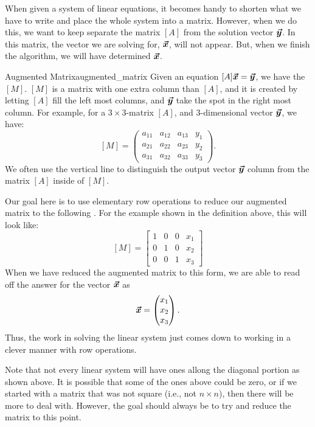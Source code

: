         When given a system of linear equations, it becomes handy to shorten what we have to write and place the whole system into a matrix.  However, when we do this, we want to keep separate the matrix $[A]$ from the solution vector $\boldsymbol{\boldsymbol{\vec{y}}}$. In this matrix, the vector we are solving for, $\boldsymbol{\boldsymbol{\vec{x}}}$, will not appear. But, when we finish the algorithm, we will have determined $\boldsymbol{\boldsymbol{\vec{x}}}$.
        
        \begin{df}{Augmented Matrix}{augmented_matrix}
        Given an equation $[A]\boldsymbol{\boldsymbol{\vec{x}}}=\boldsymbol{\boldsymbol{\vec{y}}}$, we have the   $[M]$. $[M]$ is a matrix with one extra column than $[A]$, and it is created by letting $[A]$ fill the left most columns, and $\boldsymbol{\boldsymbol{\vec{y}}}$ take the spot in the right most column. For example, for a $3\times3$-matrix $[A]$, and $3$-dimensional vector $\boldsymbol{\boldsymbol{\vec{y}}}$, we have:
        \[
        [M]=\left(\begin{array}{ccc|c}
        a_{11} & a_{12} & a_{13}  &  y_1 \\
        a_{21} & a_{22} & a_{23} & y_2\\
        a_{31} & a_{32} & a_{33} & y_3
        \end{array}\right).
        \]
        We often use the vertical line to distinguish the output vector $\boldsymbol{\boldsymbol{\vec{y}}}$ column from the matrix $[A]$ inside of $[M]$.
        \end{df}
        
        Our goal here is to use elementary row operations to reduce our augmented matrix to the following .  For the example shown in the definition above, this will look like:
        \[
        [M]=\left[\begin{array}{ccc|c}
        1 & 0 & 0  &  x_1 \\
        0 & 1 & 0 & x_2\\
        0 & 0 & 1 & x_3
        \end{array}\right]
        \]
        When we have reduced the augmented matrix to this form, we are able to read off the answer for the vector $\boldsymbol{\boldsymbol{\vec{x}}}$ as
        \[
        \boldsymbol{\boldsymbol{\vec{x}}} = \begin{pmatrix} x_1 \\ x_2 \\ x_3 \end{pmatrix}.
        \]
        Thus, the work in solving the linear system just comes down to working in a clever manner with row operations.
        
        \begin{remark}
            Note that not every linear system will have ones allong the diagonal portion as shown above.  It is possible that some of the ones above could be zero, or if we started with a matrix that was not square (i.e., not $n\times n$), then there will be more to deal with.  However, the goal should always be to try and reduce the matrix to this point.
        \end{remark}
        
